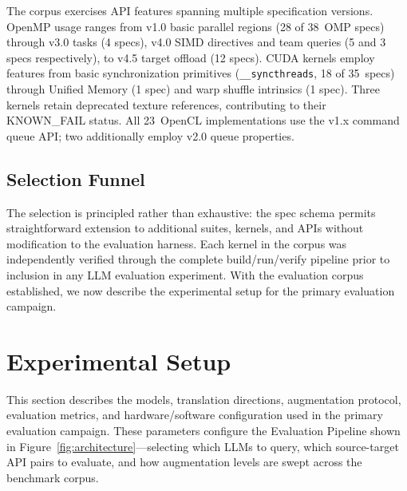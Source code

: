 \documentclass[conference]{IEEEtran}
\begin{document}
The corpus exercises API features spanning multiple specification versions. OpenMP usage ranges from v1.0 basic parallel regions (28 of 38~OMP specs) through v3.0 tasks (4 specs), v4.0 SIMD directives and team queries (5 and 3 specs respectively), to v4.5 target offload (12 specs). CUDA kernels employ features from basic synchronization primitives (\texttt{\_\_syncthreads}, 18 of 35~specs) through Unified Memory (1 spec) and warp shuffle intrinsics (1 spec). Three kernels retain deprecated texture references, contributing to their KNOWN\_FAIL status. All 23~OpenCL implementations use the v1.x command queue API; two additionally employ v2.0 queue properties.

\subsection{Selection Funnel}
\label{sec:selection-funnel}

The selection is principled rather than exhaustive: the spec schema permits straightforward extension to additional suites, kernels, and APIs without modification to the evaluation harness. Each kernel in the corpus was independently verified through the complete build/run/verify pipeline prior to inclusion in any LLM evaluation experiment. With the evaluation corpus established, we now describe the experimental setup for the primary evaluation campaign.

\section{Experimental Setup}
\label{sec:experimental-setup}

This section describes the models, translation directions, augmentation protocol, evaluation metrics, and hardware/software configuration used in the primary evaluation campaign. These parameters configure the Evaluation Pipeline shown in Figure~\ref{fig:architecture}---selecting which LLMs to query, which source-target API pairs to evaluate, and how augmentation levels are swept across the benchmark corpus.
\end{document}

